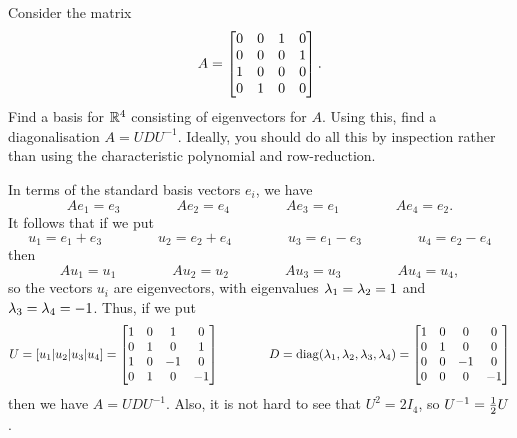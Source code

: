 \documentclass[a4paper]{amsart}
\renewenvironment{solution}{\SolutionInline}{\endSolutionInline}
\begin{document}
\begin{exercise}\label{ex-diagonal-iv}
 Consider the matrix
 \[ A = \left[\begin{matrix} 0&0&1&0 \\
             0&0&0&1 \\
             1&0&0&0 \\
             0&1&0&0 \end{matrix}\right].
 \]
 Find a basis for ${\mathbb{R}}^4$ consisting of eigenvectors for $A$.  Using
 this, find a diagonalisation $A=UDU^{-1}$.  Ideally, you should do
 all this by inspection rather than using the characteristic
 polynomial and row-reduction.
\end{exercise}
\begin{solution}
 In terms of the standard basis vectors $e_i$, we have
 \[ Ae_1 = e_3 \hspace{4em}
    Ae_2 = e_4 \hspace{4em}
    Ae_3 = e_1 \hspace{4em}
    Ae_4 = e_2. 
 \]
 It follows that if we put 
 \[ u_1 = e_1+e_3 \hspace{4em}
    u_2 = e_2+e_4 \hspace{4em}
    u_3 = e_1-e_3 \hspace{4em}
    u_4 = e_2-e_4 
 \]
 then
 \[ Au_1 = u_1 \hspace{4em}
    Au_2 = u_2 \hspace{4em}
    Au_3 = u_3 \hspace{4em}
    Au_4 = u_4,
 \]
 so the vectors $u_i$ are eigenvectors, with eigenvalues
 $\lambda_1=\lambda_2=1$ and $\lambda_3=\lambda_4=-1$.  Thus, if we put 
 \[ U = [u_1|u_2|u_3|u_4] 
      = \left[\begin{matrix}  1 &  0 &  1 &  0 \\
              0 &  1 &  0 &  1 \\
              1 &  0 & -1 &  0 \\
              0 &  1 &  0 & -1 \end{matrix}\right]
    \hspace{4em}
    D = \operatorname{diag}(\lambda_1,\lambda_2,\lambda_3,\lambda_4) 
      = \left[\begin{matrix}  1 &  0 &  0 &  0 \\
              0 &  1 &  0 &  0 \\
              0 &  0 & -1 &  0 \\
              0 &  0 &  0 & -1 \end{matrix}\right]
 \]  
 then we have $A=UDU^{-1}$.  Also, it is not hard to see that
 $U^2=2I_4$, so $U^{-1}=\tfrac{1}{2} U$.
\end{solution}
\end{document}
